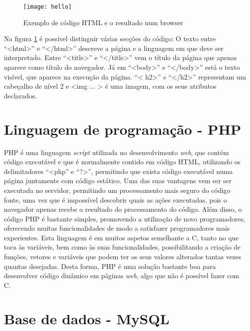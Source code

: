 \begin{figure}[hbtp]
	\centering
	\texttt{[image: hello]}
	\caption{Exemplo de código HTML e o resultado num browser}
	\label{fig:hello}
\end{figure}

Na figura \ref{fig:hello} é possível distinguir várias secções do código:
O texto entre ``<html>'' e ``</html>'' descreve a página e a linguagem em que deve ser interpretado.
Entre ``<title>'' e ``</title>'' vem o título da página que apenas aparece como título do navegador.
Já em ``<body>'' e ``</body>'' está o texto visível, que aparece na execução da página.
``< h2>'' e ``</h2>'' representam um cabeçalho de nível 2 e <img ... > é uma imagem, com os seus atributos declarados.

\section{Linguagem de programação - PHP}
\label{sec:php}

PHP é uma linguagem \emph{script} utilizada no desenvolvimento \emph{web}, que contém código executável e que é normalmente contido em código HTML, utilizando os delimitadores ``<php'' e ``?>'', permitindo que exista código executável numa página juntamente com código estático.
Uma das suas vantagens vem ser ser executada no servidor, permitindo um processamento mais seguro do código fonte, uma vez que é impossível descobrir quais as ações executadas, pois o navegador apenas recebe o resultado do processamento do código.
Além disso, o código PHP é bastante simples, promovendo a utilização de novo programadores, oferecendo muitas funcionalidades de modo a satisfazer programadores mais experientes.
Esta linguagem é em muitos aspetos semelhante a C, tanto no que toca às variáveis, bem como às suas funcionalidades, possibilitando a criação de funções, vetores e variáveis que podem ter os seus valores alterados tantas vezes quantas desejadas.
Desta forma, PHP é uma solução bastante boa para desenvolver código dinâmico em páginas \emph{web}, algo que não é possível fazer com C.

\section{Base de dados - MySQL}
\label{sec:MySQL}

